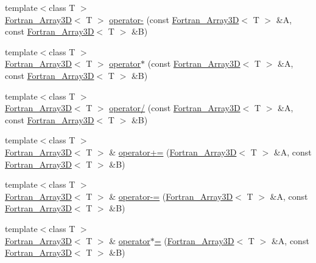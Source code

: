 \begin{DoxyCompactItemize}
\item 
{\footnotesize template$<$class T $>$ }\\\hyperlink{classTNT_1_1Fortran__Array3D}{Fortran\-\_\-\-Array3\-D}$<$ T $>$ \hyperlink{namespaceTNT_a673a55b86c9a9e0d59b29bf5214dd141}{operator-\/} (const \hyperlink{classTNT_1_1Fortran__Array3D}{Fortran\-\_\-\-Array3\-D}$<$ T $>$ \&A, const \hyperlink{classTNT_1_1Fortran__Array3D}{Fortran\-\_\-\-Array3\-D}$<$ T $>$ \&B)
\item 
{\footnotesize template$<$class T $>$ }\\\hyperlink{classTNT_1_1Fortran__Array3D}{Fortran\-\_\-\-Array3\-D}$<$ T $>$ \hyperlink{namespaceTNT_a0463d6c8ceb6ba5fe8217a0482ae7d90}{operator$\ast$} (const \hyperlink{classTNT_1_1Fortran__Array3D}{Fortran\-\_\-\-Array3\-D}$<$ T $>$ \&A, const \hyperlink{classTNT_1_1Fortran__Array3D}{Fortran\-\_\-\-Array3\-D}$<$ T $>$ \&B)
\item 
{\footnotesize template$<$class T $>$ }\\\hyperlink{classTNT_1_1Fortran__Array3D}{Fortran\-\_\-\-Array3\-D}$<$ T $>$ \hyperlink{namespaceTNT_ae8a226ec8d85aa84a8f321ab3556c7a0}{operator/} (const \hyperlink{classTNT_1_1Fortran__Array3D}{Fortran\-\_\-\-Array3\-D}$<$ T $>$ \&A, const \hyperlink{classTNT_1_1Fortran__Array3D}{Fortran\-\_\-\-Array3\-D}$<$ T $>$ \&B)
\item 
{\footnotesize template$<$class T $>$ }\\\hyperlink{classTNT_1_1Fortran__Array3D}{Fortran\-\_\-\-Array3\-D}$<$ T $>$ \& \hyperlink{namespaceTNT_ac38073ccc2a38c912215dc2e607f1e7d}{operator+=} (\hyperlink{classTNT_1_1Fortran__Array3D}{Fortran\-\_\-\-Array3\-D}$<$ T $>$ \&A, const \hyperlink{classTNT_1_1Fortran__Array3D}{Fortran\-\_\-\-Array3\-D}$<$ T $>$ \&B)
\item 
{\footnotesize template$<$class T $>$ }\\\hyperlink{classTNT_1_1Fortran__Array3D}{Fortran\-\_\-\-Array3\-D}$<$ T $>$ \& \hyperlink{namespaceTNT_ac3eb8bd76e8c6e92d7633421b2f27905}{operator-\/=} (\hyperlink{classTNT_1_1Fortran__Array3D}{Fortran\-\_\-\-Array3\-D}$<$ T $>$ \&A, const \hyperlink{classTNT_1_1Fortran__Array3D}{Fortran\-\_\-\-Array3\-D}$<$ T $>$ \&B)
\item 
{\footnotesize template$<$class T $>$ }\\\hyperlink{classTNT_1_1Fortran__Array3D}{Fortran\-\_\-\-Array3\-D}$<$ T $>$ \& \hyperlink{namespaceTNT_a6390e0158dfa25e89cb28bb196ac9dc6}{operator$\ast$=} (\hyperlink{classTNT_1_1Fortran__Array3D}{Fortran\-\_\-\-Array3\-D}$<$ T $>$ \&A, const \hyperlink{classTNT_1_1Fortran__Array3D}{Fortran\-\_\-\-Array3\-D}$<$ T $>$ \&B)

\end{DoxyCompactItemize}
